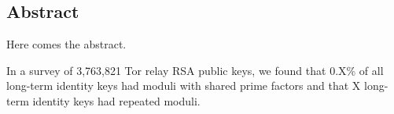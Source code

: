 \subsection*{Abstract}
Here comes the abstract.

In a survey of 3,763,821 Tor relay RSA public keys, we found that 0.X\% 
of all long-term identity keys had moduli with shared prime factors and 
that X long-term identity keys had repeated moduli.
